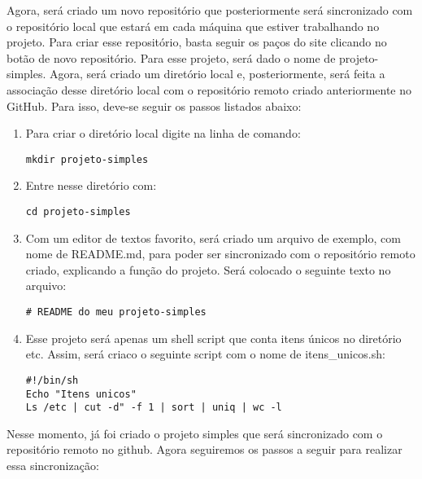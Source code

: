 Agora, será criado um novo repositório que posteriormente 
será sincronizado com o repositório local que estará em 
cada máquina que estiver trabalhando no projeto. Para criar 
esse repositório, basta seguir os paços do site clicando 
no botão de novo repositório. Para esse projeto, será dado 
o nome de projeto-simples. Agora, será criado um diretório 
local e, posteriormente, será feita a associação desse 
diretório local com o repositório remoto criado 
anteriormente no GitHub. Para isso, deve-se seguir os 
passos listados abaixo:

\begin{enumerate}
   \item Para criar o diretório local digite na linha de comando:
      \begin{lstlisting}
mkdir projeto-simples
      \end{lstlisting}
      
   \item Entre nesse diretório com:
      \begin{lstlisting}
cd projeto-simples
      \end{lstlisting}
   
   \item Com um editor de textos favorito, será criado um arquivo 
   de exemplo, com nome de README.md, para poder ser sincronizado 
   com o repositório remoto criado, explicando a função do projeto. 
   Será colocado o seguinte texto no arquivo:
   
      \begin{lstlisting}
# README do meu projeto-simples
      \end{lstlisting}
   
   \item Esse projeto será apenas um shell script que conta 
   itens únicos no diretório \/etc. Assim, será criaco o 
   seguinte script com o nome de itens\_unicos.sh:
   
      \begin{lstlisting}
#!/bin/sh
Echo "Itens unicos"
Ls /etc | cut -d" -f 1 | sort | uniq | wc -l
      \end{lstlisting}
      
 \end{enumerate}

Nesse momento, já foi criado o projeto simples que será 
sincronizado com o repositório remoto no github. Agora 
seguiremos os passos a seguir para realizar essa sincronização:

